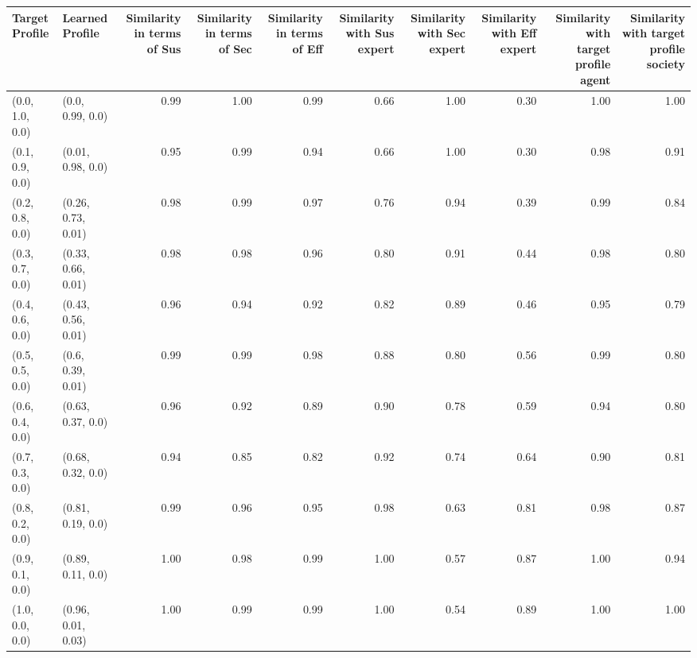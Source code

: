 \begin{tabular}{llrrrrrrrr}
\toprule
Target Profile & Learned Profile & Similarity in terms of Sus & Similarity in terms of Sec & Similarity in terms of Eff & Similarity with Sus expert & Similarity with Sec expert & Similarity with Eff expert & Similarity with target profile agent & Similarity with target profile society \\
\midrule
(0.0, 1.0, 0.0) & (0.0, 0.99, 0.0) & 0.99 & 1.00 & 0.99 & 0.66 & 1.00 & 0.30 & 1.00 & 1.00 \\
(0.1, 0.9, 0.0) & (0.01, 0.98, 0.0) & 0.95 & 0.99 & 0.94 & 0.66 & 1.00 & 0.30 & 0.98 & 0.91 \\
(0.2, 0.8, 0.0) & (0.26, 0.73, 0.01) & 0.98 & 0.99 & 0.97 & 0.76 & 0.94 & 0.39 & 0.99 & 0.84 \\
(0.3, 0.7, 0.0) & (0.33, 0.66, 0.01) & 0.98 & 0.98 & 0.96 & 0.80 & 0.91 & 0.44 & 0.98 & 0.80 \\
(0.4, 0.6, 0.0) & (0.43, 0.56, 0.01) & 0.96 & 0.94 & 0.92 & 0.82 & 0.89 & 0.46 & 0.95 & 0.79 \\
(0.5, 0.5, 0.0) & (0.6, 0.39, 0.01) & 0.99 & 0.99 & 0.98 & 0.88 & 0.80 & 0.56 & 0.99 & 0.80 \\
(0.6, 0.4, 0.0) & (0.63, 0.37, 0.0) & 0.96 & 0.92 & 0.89 & 0.90 & 0.78 & 0.59 & 0.94 & 0.80 \\
(0.7, 0.3, 0.0) & (0.68, 0.32, 0.0) & 0.94 & 0.85 & 0.82 & 0.92 & 0.74 & 0.64 & 0.90 & 0.81 \\
(0.8, 0.2, 0.0) & (0.81, 0.19, 0.0) & 0.99 & 0.96 & 0.95 & 0.98 & 0.63 & 0.81 & 0.98 & 0.87 \\
(0.9, 0.1, 0.0) & (0.89, 0.11, 0.0) & 1.00 & 0.98 & 0.99 & 1.00 & 0.57 & 0.87 & 1.00 & 0.94 \\
(1.0, 0.0, 0.0) & (0.96, 0.01, 0.03) & 1.00 & 0.99 & 0.99 & 1.00 & 0.54 & 0.89 & 1.00 & 1.00 \\
\bottomrule
\end{tabular}
